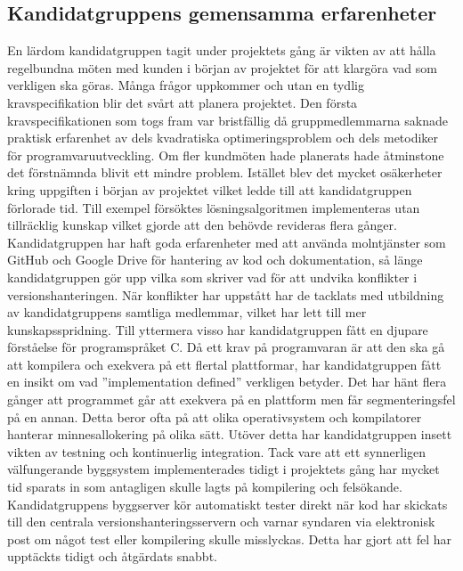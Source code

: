 	
\subsection{Kandidatgruppens gemensamma erfarenheter}
En lärdom kandidatgruppen tagit under projektets gång är vikten av att hålla regelbundna möten med kunden i början av projektet för att klargöra vad som verkligen ska göras. Många frågor uppkommer och utan en tydlig kravspecifikation blir det svårt att planera projektet. Den första kravspecifikationen som togs fram var bristfällig då gruppmedlemmarna saknade praktisk erfarenhet av dels kvadratiska optimeringsproblem och dels metodiker för programvaruutveckling. Om fler kundmöten hade planerats hade åtminstone det förstnämnda blivit ett mindre problem. Istället blev det mycket osäkerheter kring uppgiften i början av projektet vilket ledde till att kandidatgruppen förlorade tid. Till exempel försöktes lösningsalgoritmen implementeras utan tillräcklig kunskap vilket gjorde att den behövde revideras flera gånger.
\newline
\newline
Kandidatgruppen har haft goda erfarenheter med att använda molntjänster som GitHub och Google Drive för hantering av kod och dokumentation, så länge kandidatgruppen gör upp vilka som skriver vad för att undvika konflikter i versionshanteringen. När konflikter har uppstått har de tacklats med utbildning av kandidatgruppens samtliga medlemmar, vilket har lett till mer kunskapsspridning.
\newline
\newline
Till yttermera visso har kandidatgruppen fått en djupare förståelse för programspråket C. Då ett krav på programvaran är att den ska gå att kompilera och exekvera på ett flertal plattformar, har kandidatgruppen fått en insikt om vad ''implementation defined'' verkligen betyder. Det har hänt flera gånger att programmet går att exekvera på en plattform men får segmenteringsfel på en annan. Detta beror ofta på att olika operativsystem och kompilatorer hanterar minnesallokering på olika sätt.
\newline
\newline
Utöver detta har kandidatgruppen insett vikten av testning och kontinuerlig integration. Tack vare att ett synnerligen välfungerande byggsystem implementerades tidigt i projektets gång har mycket tid sparats in som antagligen skulle lagts på kompilering och felsökande. Kandidatgruppens byggserver kör automatiskt tester direkt när kod har skickats till den centrala versionshanteringsservern och varnar syndaren via elektronisk post om något test eller kompilering skulle misslyckas. Detta har gjort att fel har upptäckts tidigt och åtgärdats snabbt.

